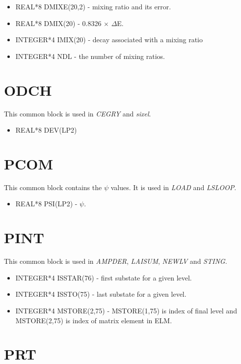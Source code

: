 \begin{itemize}
\item REAL*8 DMIXE(20,2) - mixing ratio and its error.
\item REAL*8 DMIX(20) - 0.8326 $\times$ $\Delta$E.
\item INTEGER*4 IMIX(20) - decay associated with a mixing ratio
\item INTEGER*4 NDL - the number of mixing ratios.
\end{itemize}

\section{ODCH}

This common block is used in \emph{CEGRY} and \emph{sixel}.

\begin{itemize}
\item REAL*8 DEV(LP2)
\end{itemize}

\section{PCOM}

This common block contains the $\psi$ values. It is used in \emph{LOAD} and
\emph{LSLOOP}.

\begin{itemize}
\item REAL*8 PSI(LP2) - $\psi$.
\end{itemize}

\section{PINT}

This common block is used in \emph{AMPDER}, \emph{LAISUM}, \emph{NEWLV} and
\emph{STING}.

\begin{itemize}
\item INTEGER*4 ISSTAR(76) - first substate for a given level.
\item INTEGER*4 ISSTO(75) - last substate for a given level.
\item INTEGER*4 MSTORE(2,75) - MSTORE(1,75) is index of final level and
MSTORE(2,75) is index of matrix element in ELM.
\end{itemize}

\section{PRT}

